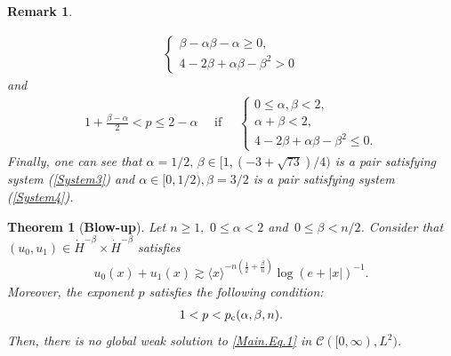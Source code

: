 \documentclass[11pt,reqno]{amsart}
\newtheorem{theorem}{Theorem}[section]
\newtheorem{remark}{Remark}[section]
\begin{document}
\begin{remark}
\begin{itemize}[leftmargin=*]
\begin{align}
\begin{cases}
               \beta-\alpha\beta-\alpha \geq 0,\\
               4-2\beta+\alpha\beta-\beta^2 > 0
           \end{cases}\label{System3}
            \end{align}
        and 
        \begin{align}
            1+\frac{\beta-\alpha}{2} < p \leq 2-\alpha  \quad\text{ if }\quad 
               \begin{cases}
               0 \leq \alpha, \beta < 2 ,\\
               \alpha+\beta < 2,\\
               4-2\beta+\alpha\beta-\beta^2 \leq 0.
        \end{cases}\label{System4}
        \end{align}
        Finally, one can see that $\alpha = 1/2, \, \beta \in [1, (-3+\sqrt{73})/4)$ is a pair satisfying system (\ref{System3}) and $\alpha \in [0, 1/2), \beta = 3/2 $ is a pair satisfying system (\ref{System4}).
        \end{itemize}
    \end{remark}

    \begin{theorem}[\textbf{Blow-up}]\label{Theorem2}
        Let $n \geq 1, \,\, 0 \leq \alpha < 2$ and \,$0 \leq  \beta < n/2$. Consider that $(u_0, u_1) \in \dot{H}^{-\beta} \times \dot{H}^{-\beta} $ satisfies
        \begin{align}\label{condition2.1}
         u_0(x) + u_1(x) \gtrsim \langle x \rangle^{-n(\frac{1}{2}+\frac{\beta}{n})} \log(e+|x|)^{-1}.  
        \end{align}
        Moreover, the exponent $p$ satisfies the following condition:
        \begin{align}\label{condition2.2}
            1 < p < p_{\rm c}(\alpha,\beta,n).
        \end{align}
        Then, there is no global weak solution to \eqref{Main.Eq.1} in $\mathcal{C}([0, \infty), L^2)$.
    \end{theorem}
\end{document}
